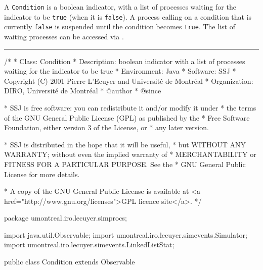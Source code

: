 
A \texttt{Condition} is a boolean indicator, with a list of processes  
waiting for the indicator to be \texttt{true} (when it is \texttt{false}).
A process calling  on a condition that is currently
\texttt{false} is suspended until the condition becomes \texttt{true}.
The list of waiting processes can be accessed via .

\bigskip\hrule

\begin{code}
\begin{hide}
/*
 * Class:        Condition
 * Description:  boolean indicator with a list of processes waiting for 
                 the indicator to be true
 * Environment:  Java
 * Software:     SSJ 
 * Copyright (C) 2001  Pierre L'Ecuyer and Université de Montréal
 * Organization: DIRO, Université de Montréal
 * @author       
 * @since

 * SSJ is free software: you can redistribute it and/or modify it under
 * the terms of the GNU General Public License (GPL) as published by the
 * Free Software Foundation, either version 3 of the License, or
 * any later version.

 * SSJ is distributed in the hope that it will be useful,
 * but WITHOUT ANY WARRANTY; without even the implied warranty of
 * MERCHANTABILITY or FITNESS FOR A PARTICULAR PURPOSE.  See the
 * GNU General Public License for more details.

 * A copy of the GNU General Public License is available at
   <a href="http://www.gnu.org/licenses">GPL licence site</a>.
 */
\end{hide}
package umontreal.iro.lecuyer.simprocs;\begin{hide}
import java.util.Observable;
import umontreal.iro.lecuyer.simevents.Simulator;
import umontreal.iro.lecuyer.simevents.LinkedListStat;\end{hide}

public class Condition extends Observable \begin{hide} {

   private String name;
   private LinkedListStat<UserRecord> waitingList;
   private boolean state;
   private boolean broadcasting;
   private ProcessSimulator sim;
\end{hide}\end{code}

